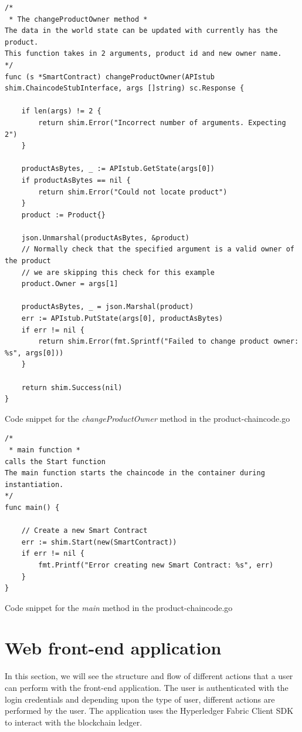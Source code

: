 \documentclass[
  a4paper,  %
  twoside,  %
  bibliography=totoc,
  headsepline,
  cleardoublepage=empty,
  parskip=half,
  draft=false
]{scrbook}
\begin{document}
\begin{Listing}[h!]
\begin{lstlisting}
/*
 * The changeProductOwner method *
The data in the world state can be updated with currently has the product.
This function takes in 2 arguments, product id and new owner name.
*/
func (s *SmartContract) changeProductOwner(APIstub shim.ChaincodeStubInterface, args []string) sc.Response {

	if len(args) != 2 {
		return shim.Error("Incorrect number of arguments. Expecting 2")
	}

	productAsBytes, _ := APIstub.GetState(args[0])
	if productAsBytes == nil {
		return shim.Error("Could not locate product")
	}
	product := Product{}

	json.Unmarshal(productAsBytes, &product)
	// Normally check that the specified argument is a valid owner of the product
	// we are skipping this check for this example
	product.Owner = args[1]

	productAsBytes, _ = json.Marshal(product)
	err := APIstub.PutState(args[0], productAsBytes)
	if err != nil {
		return shim.Error(fmt.Sprintf("Failed to change product owner: %s", args[0]))
	}

	return shim.Success(nil)
}
\end{lstlisting}
\caption{Code snippet for the \textit{changeProductOwner} method in the product-chaincode.go}
\label{lst:update}
\end{Listing}
\begin{Listing}[h!]
\begin{lstlisting}
/*
 * main function *
calls the Start function
The main function starts the chaincode in the container during instantiation.
*/
func main() {

	// Create a new Smart Contract
	err := shim.Start(new(SmartContract))
	if err != nil {
		fmt.Printf("Error creating new Smart Contract: %s", err)
	}
}
\end{lstlisting}
\caption{Code snippet for the \textit{main} method in the product-chaincode.go}
\label{lst:main}
\end{Listing}

\section{Web front-end application}
In this section, we will see the structure and flow of different actions that a user can perform with the front-end application. The user is authenticated with the login credentials and depending upon the type of user, different actions are performed by the user. The application uses the Hyperledger Fabric Client SDK to interact with the blockchain ledger.
\end{document}
